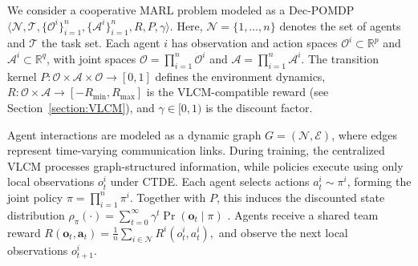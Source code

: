 \documentclass[letterpaper, 10 pt, conference]{ieeeconf}  %
\begin{document}

We consider a cooperative MARL problem modeled as a Dec-POMDP
$
\langle \mathcal{N}, \mathcal{T}, \{\mathcal{O}^i\}_{i=1}^n,
\{\mathcal{A}^i\}_{i=1}^n, R, P, \gamma \rangle .
$
Here, $\mathcal{N}=\{1,\dots,n\}$ denotes the set of agents and $\mathcal{T}$ the task set. 
Each agent $i$ has observation and action spaces 
$\mathcal{O}^i \subset \mathbb{R}^p$ and 
$\mathcal{A}^i \subset \mathbb{R}^q$, with joint spaces 
$\mathcal{O}=\prod_{i=1}^n \mathcal{O}^i$ and 
$\mathcal{A}=\prod_{i=1}^n \mathcal{A}^i$. 
The transition kernel 
$P:\mathcal{O}\times\mathcal{A}\times\mathcal{O}\to[0,1]$ 
defines the environment dynamics, 
$R:\mathcal{O}\times\mathcal{A}\to[-R_{\min},R_{\max}]$ 
is the VLCM-compatible reward (see Section~\ref{section:VLCM}), 
and $\gamma\in[0,1)$ is the discount factor.

Agent interactions are modeled as a dynamic graph 
$G=(\mathcal{N},\mathcal{E})$, where edges represent time-varying communication links. 
During training, the centralized VLCM processes graph-structured information, 
while policies execute using only local observations $o_t^i$ under CTDE. 
Each agent selects actions $a_t^i \sim \pi^i$, forming the joint policy 
$\pi=\prod_{i=1}^n \pi^i$. 
Together with $P$, this induces the discounted state distribution
$
\rho_{\pi}(\cdot)=\sum_{t=0}^{\infty}\gamma^t 
\Pr(\mathbf{o}_t \mid \pi)
$
\cite{wen2022multi}. 
Agents receive a shared team reward
$
R(\mathbf{o}_t,\mathbf{a}_t)
= \frac{1}{n}\sum_{i\in\mathcal{N}} R^i(o_t^i,a_t^i),
$
and observe the next local observations $o_{t+1}^i$.
\end{document}
